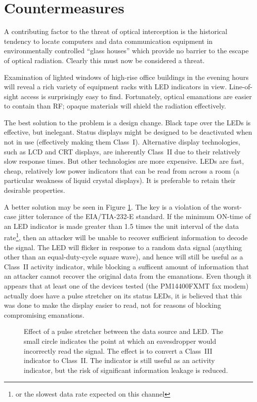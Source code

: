 \documentclass[twocolumn]{article}
\begin{document}
\section{Countermeasures}

A contributing factor to the threat of optical interception is the historical tendency to locate computers and data communication equipment in environmentally controlled ``glass houses'' which provide no barrier to the escape of optical radiation.  Clearly this must now be considered a threat.

Examination of lighted windows of high-rise office buildings in the evening hours will reveal a rich variety of equipment racks with LED indicators in view.  Line-of-sight access is surprisingly easy to find.  Fortunately, optical emanations are easier to contain than RF; opaque materials will shield the radiation effectively.
 
The best solution to the problem is a design change.  Black tape over the LEDs is effective, but inelegant.  Status displays might be designed to be deactivated when not in use (effectively making them Class~I).  Alternative display technologies, such as LCD and CRT displays, are inherently Class~II due to their relatively slow response times.  But other technologies are more expensive.  LEDs are fast, cheap, relatively low power indicators that can be read from across a room (a particular weakness of liquid crystal displays).  It is preferable to retain their desirable properties.

A better solution may be seen in Figure \ref{pulse_stretcher_figure}.  The key is a violation of the worst-case jitter tolerance of the EIA/TIA-232-E standard.  If the minimum ON-time of an LED indicator is made greater than 1.5 times the unit interval of the data rate\footnote{or the slowest data rate expected on this channel}, then an attacker will be unable to recover sufficient information to decode the signal.  The LED will flicker in response to a random data signal (anything other than an equal-duty-cycle square wave), and hence will still be useful as a Class~II activity indicator, while blocking a sufficent amount of information that an attacker cannot recover the original data from the emanations.  Even though it appears that at least one of the devices tested (the PM14400FXMT fax modem) actually does have a pulse stretcher on its status LEDs, it is believed that this was done to make the display easier to read, not for reasons of blocking compromising emanations.

\begin{figure}[htbp]
\centerline{\epsfysize=1.5in }
\caption{Effect of a pulse stretcher between the data source and LED.  The small circle indicates the point at which an eavesdropper would incorrectly read the signal.  The effect is to convert a Class~III indicator to Class~II.  The indicator is still useful as an activity indicator, but the risk of significant information leakage is reduced.}
\label{pulse_stretcher_figure}
\end{figure}
\end{document}
